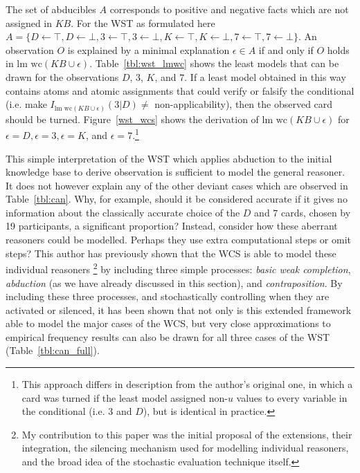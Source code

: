 The set of abducibles $A$ corresponds to positive and negative facts which are not assigned in $KB$. For the WST as formulated here $A=\{D\leftarrow \top,D\leftarrow \bot,3\leftarrow \top,3\leftarrow \bot,K\leftarrow \top,K\leftarrow \bot,7\leftarrow \top,7\leftarrow \bot\}$.
 An observation $O$ is explained by a minimal explanation $\epsilon \in A$ if and only if $O$ holds in $\textrm{lm wc}(KB\cup\epsilon)$. Table~\ref{tbl:wst_lmwc} shows the least models that can be drawn for the observations $D$, $3$, $K$, and $7$. If a least model obtained in this way contains atoms and atomic assignments that could verify or falsify the conditional (i.e. make $I_{\textrm{lm wc}(KB\cup \epsilon)}(3|D)\neq$ non-applicability), then the observed card should be turned. Figure~\ref{wst_wcs} shows the derivation of $\textrm{lm wc}(KB\cup \epsilon)$ for $\epsilon=D, \epsilon=3, \epsilon=K$, and $\epsilon=7$.\footnote{This approach differs in description from the author's original one, in which a card was turned if the least model assigned non-$u$ values to every variable in the conditional (i.e. $3$ and $D$), but is identical in practice.}


This simple interpretation of the WST which applies abduction to the initial knowledge base to derive observation is sufficient to model the general reasoner. It does not however explain any of the other deviant cases which are observed in Table~\ref{tbl:can}. Why, for example, should it be considered accurate if it gives no information about the classically accurate choice of the $D$ and $7$ cards, chosen by 19 participants, a significant proportion? Instead, consider how these aberrant reasoners could be modelled. Perhaps they use extra computational steps or omit steps? This author has previously shown that the WCS is able to model these individual reasoners \citep{breu2019weak}\footnote{My contribution to this paper was the initial proposal of the extensions, their integration, the silencing mechanism used for modelling individual reasoners, and the broad idea of the stochastic evaluation technique itself.} by including three simple processes: \textit{basic weak completion}, \textit{abduction} (as we have already discussed in this section), and \textit{contraposition}. By including these three processes, and stochastically controlling when they are activated or silenced, it has been shown that not only is this extended framework able to model the major cases of the WCS, but very close approximations to empirical frequency results can also be drawn for all three cases of the WST (Table~\ref{tbl:can_full}).

